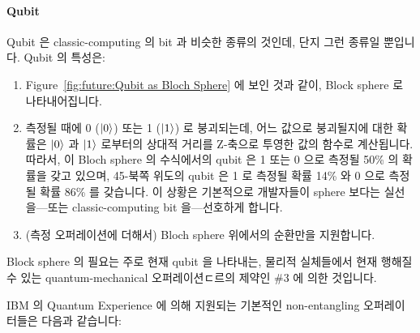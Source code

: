 \paragraph{Qubit}

Qubit 은 classic-computing 의 bit 과 비슷한 종류의 것인데, 단지 그런 종류일
뿐입니다.
Qubit 의 특성은:

\begin{enumerate}
\item	Figure~\ref{fig:future:Qubit as Bloch Sphere} 에 보인 것과 같이, Block
	sphere 로 나타내어집니다.
\item	측정될 때에 0 ($\ket{0}$) 또는 1 ($\ket{1}$) 로 붕괴되는데, 어느 값으로
	붕괴될지에 대한 확률은 $\ket{0}$ 과 $\ket{1}$ 로부터의 상대적 거리를
	Z-축으로 투영한 값의 함수로 계산됩니다.
	따라서, 이 Bloch sphere 의 수식에서의 qubit 은 1 또는 0 으로 측정될
	50\% 의 확률을 갖고 있으며, 45\textdegree-북쪽 위도의 qubit 은 1 로
	측정될 확률 14\% 와 0 으로 측정될 확률 86\% 를 갖습니다.
	이 상황은 기본적으로 개발자들이 sphere 보다는 실선을---또는
	classic-computing bit 을---선호하게 합니다.
\item	(측정 오퍼레이션에 더해서) Bloch sphere 위에서의 순환만을 지원합니다.

\end{enumerate}

Block sphere 의 필요는 주로 현재 qubit 을 나타내는, 물리적 실체들에서 현재
행해질 수 있는 quantum-mechanical 오퍼레이션ㄷ르의 제약인 \#3 에 의한 것입니다.

IBM 의 Quantum Experience 에 의해 지원되는 기본적인 non-entangling
오퍼레이터들은 다음과 같습니다:
\iffalse

